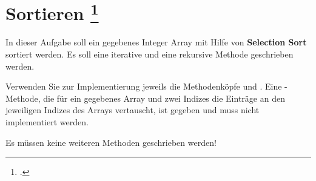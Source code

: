 \documentclass{lehramt-informatik-aufgabe}
\begin{document}

\section{Sortieren
\footcite[Aufgabe 2]{aud:e-klausur}}

In dieser Aufgabe soll ein gegebenes Integer Array mit Hilfe von
\textbf{Selection Sort} sortiert werden. Es soll eine
iterative und eine
rekursive Methode geschrieben werden.

Verwenden Sie zur Implementierung jeweils die Methodenköpfe
 und . Eine
-Methode, die für ein gegebenes Array und zwei Indizes die
Einträge an den jeweiligen Indizes des Arrays vertauscht, ist gegeben
und muss nicht implementiert werden.

Es müssen keine weiteren Methoden geschrieben werden!

\begin{antwort}



\end{antwort}
\end{document}
